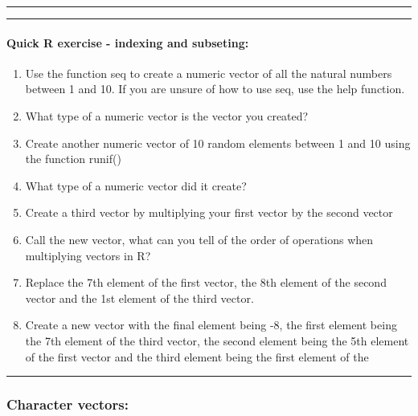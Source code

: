 \documentclass[
]{book}
\theoremstyle{definition}
\theoremstyle{definition}
\theoremstyle{definition}
\theoremstyle{definition}
\theoremstyle{remark}
\begin{document}
\begin{center}\rule{0.5\linewidth}{0.5pt}\end{center}

\begin{center}\rule{0.5\linewidth}{0.5pt}\end{center}

\hypertarget{quick-r-exercise---indexing-and-subseting}{%
\paragraph*{\texorpdfstring{\textbf{Quick R exercise - indexing and subseting:}}{Quick R exercise - indexing and subseting:}}\label{quick-r-exercise---indexing-and-subseting}}

\begin{enumerate}
\def\labelenumi{\arabic{enumi}.}
\item
  Use the function seq to create a numeric vector of all the natural numbers between 1 and 10.
  If you are unsure of how to use seq, use the help function.
\item
  What type of a numeric vector is the vector you created?
\item
  Create another numeric vector of 10 random elements between 1 and 10 using the function runif()
\item
  What type of a numeric vector did it create?
\item
  Create a third vector by multiplying your first vector by the second vector
\item
  Call the new vector, what can you tell of the order of operations when multiplying vectors in R?
\item
  Replace the 7th element of the first vector, the 8th element of the second vector and the 1st element of the third vector.
\item
  Create a new vector with the final element being -8, the first element being the 7th element of the third vector, the second element being the 5th element of the first vector and the third element being the first element of the
\end{enumerate}

\begin{center}\rule{0.5\linewidth}{0.5pt}\end{center}

\hypertarget{character-vectors}{%
\subsubsection*{\texorpdfstring{\textbf{Character vectors:}}{Character vectors:}}\label{character-vectors}}
\end{document}
